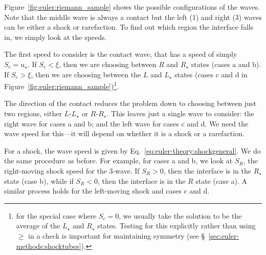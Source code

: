 Figure~\ref{fig:euler:riemann_sample} shows the possible
configurations of the waves.  Note that the middle wave is always a
contact but the left (1) and right (3) waves can be either a shock or
rarefaction.  To find out which region the interface falls in, we simply
look at the speeds.

The first speed to consider is the contact wave, that has a speed of
simply $S_c = u_\star$.  If $S_c < \xi$, then we are choosing between
$R$ and $R_\star$ states (cases a and b).  If $S_c > \xi$, then we are
choosing between the $L$ and $L_\star$ states (cases c and d in
Figure~\ref{fig:euler:riemann_sample})\footnote{for the special case
  where $S_c = 0$, we usually take the solution to be the average of
  the $L_\star$ and $R_\star$ states.  Testing for this explicitly
  rather than using $\ge$ in a check is important for maintaining
  symmetry (see \S~\ref{sec:euler-methods:shocktubes}).}.

The direction of the contact reduces the problem down to choosing
between just two regions, either $L$-$L_\star$ or $R$-$R_\star$.  This
leaves just a single wave to consider: the right wave for cases a and
b; and the left wave for cases c and d.  We need the wave speed for
this---it will depend on whether it is a shock or a rarefaction.

For a shock, the wave speed is given by
Eq.~\ref{eq:euler-theory:shockgeneral}.  We do the same procedure as
before.  For example, for cases a and b, we look at $S_R$, the
right-moving shock speed for the 3-wave.  If $S_R > 0$, then the
interface is in the $R_\star$ state (case b), while if $S_R < 0$, then
the interface is in the $R$ state (case a).  A similar process
holds for the left-moving shock and cases c and d.

